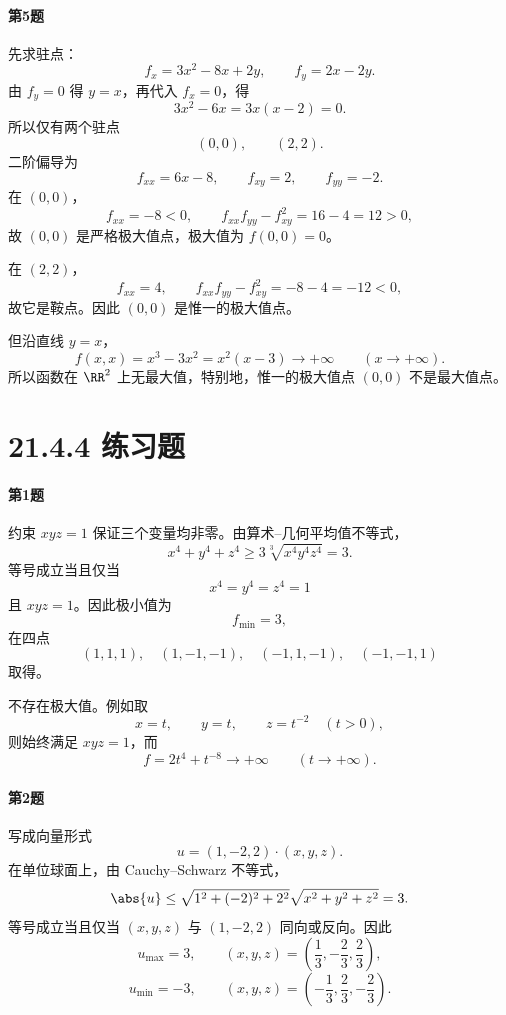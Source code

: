 \paragraph{第5题}
\begin{xsolution}
先求驻点：
\[
  f_x=3x^2-8x+2y,
  \qquad
  f_y=2x-2y.
\]
由 $f_y=0$ 得 $y=x$，再代入 $f_x=0$，得
\[
  3x^2-6x=3x(x-2)=0.
\]
所以仅有两个驻点
\[
  (0,0),\qquad(2,2).
\]
二阶偏导为
\[
  f_{xx}=6x-8,
  \qquad f_{xy}=2,
  \qquad f_{yy}=-2.
\]
在 $(0,0)$，
\[
  f_{xx}=-8<0,
  \qquad
  f_{xx}f_{yy}-f_{xy}^2=16-4=12>0,
\]
故 $(0,0)$ 是严格极大值点，极大值为 $f(0,0)=0$。

在 $(2,2)$，
\[
  f_{xx}=4,
  \qquad
  f_{xx}f_{yy}-f_{xy}^2=-8-4=-12<0,
\]
故它是鞍点。因此 $(0,0)$ 是惟一的极大值点。

但沿直线 $y=x$，
\[
  f(x,x)=x^3-3x^2=x^2(x-3)\to+\infty
  \qquad(x\to+\infty).
\]
所以函数在 $\RR^2$ 上无最大值，特别地，惟一的极大值点 $(0,0)$ 不是最大值点。
\end{xsolution}
\section*{21.4.4 练习题}

\paragraph{第1题}
\begin{xsolution}
约束 $xyz=1$ 保证三个变量均非零。由算术--几何平均值不等式，
\[
  x^4+y^4+z^4
  \ge3\sqrt[3]{x^4y^4z^4}
  =3.
\]
等号成立当且仅当
\[
  x^4=y^4=z^4=1
\]
且 $xyz=1$。因此极小值为
\[
  f_{\min}=3,
\]
在四点
\[
  (1,1,1),\quad(1,-1,-1),\quad(-1,1,-1),\quad(-1,-1,1)
\]
取得。

不存在极大值。例如取
\[
  x=t,\qquad y=t,\qquad z=t^{-2}\quad(t>0),
\]
则始终满足 $xyz=1$，而
\[
  f=2t^4+t^{-8}\to+\infty\qquad(t\to+\infty).
\]
\end{xsolution}

\paragraph{第2题}
\begin{xsolution}
写成向量形式
\[
  u=(1,-2,2)\cdot(x,y,z).
\]
在单位球面上，由 Cauchy--Schwarz 不等式，
\[
  \abs{u}\le\sqrt{1^2+(-2)^2+2^2}\sqrt{x^2+y^2+z^2}=3.
\]
等号成立当且仅当 $(x,y,z)$ 与 $(1,-2,2)$ 同向或反向。因此
\[
  u_{\max}=3,
  \qquad
  (x,y,z)=\left(\frac13,-\frac23,\frac23\right),
\]
\[
  u_{\min}=-3,
  \qquad
  (x,y,z)=\left(-\frac13,\frac23,-\frac23\right).
\]
\end{xsolution}

